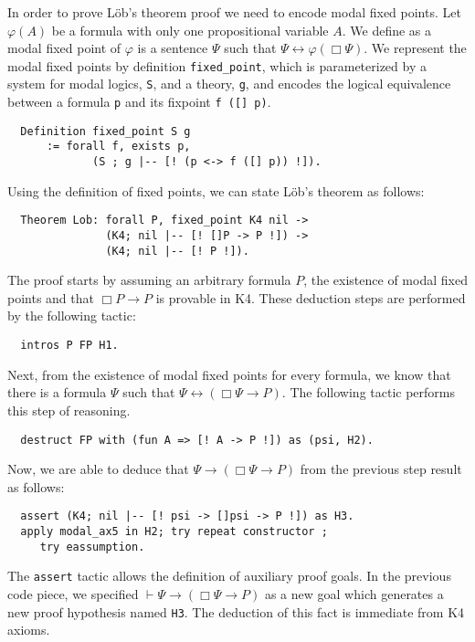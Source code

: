 \documentclass[sigconf]{acmart}
\begin{document}
In order to prove L\"ob's theorem proof we need to encode modal
fixed points. Let $\varphi(A)$ be a formula with only one propositional variable
$A$. We define as a modal fixed point of $\varphi$ is a sentence $\Psi$ such that
$\Psi \leftrightarrow \varphi(\Box \Psi)$.
We represent the modal fixed points by definition \texttt{fixed_point},
which is parameterized by a system for modal logics, \texttt{S}, and a
theory, \texttt{g}, and encodes the logical equivalence between a
formula \texttt{p} and its fixpoint \texttt{f ([] p)}. 
\begin{verbatim}
  Definition fixed_point S g
      := forall f, exists p,
             (S ; g |-- [! (p <-> f ([] p)) !]).
\end{verbatim}

\noindent Using the definition of fixed points, we can state L\"ob's theorem as follows:

\begin{verbatim}
  Theorem Lob: forall P, fixed_point K4 nil ->
               (K4; nil |-- [! []P -> P !]) ->
               (K4; nil |-- [! P !]).
\end{verbatim}

\noindent The proof starts by assuming an arbitrary formula $P$, the existence of modal fixed
points and that $\Box P \to P$ is provable in K4. These deduction steps
are performed by the following tactic:

\begin{verbatim}
  intros P FP H1.
\end{verbatim}

\noindent Next, from the existence of modal fixed points for every formula,
we know that there is a formula $\Psi$ such that $\Psi \leftrightarrow (\Box
\Psi \to P)$. The following tactic performs this step of reasoning.

\begin{verbatim}
  destruct FP with (fun A => [! A -> P !]) as (psi, H2).
\end{verbatim}

\noindent Now, we are able to deduce that $\Psi \to (\Box \Psi\to P)$ from the previous
step result as follows:

\begin{verbatim}
  assert (K4; nil |-- [! psi -> []psi -> P !]) as H3.
  apply modal_ax5 in H2; try repeat constructor ;
     try eassumption.
\end{verbatim}

\noindent The \texttt{assert} tactic allows the definition of
auxiliary proof goals. In the previous code piece, we specified
$\vdash \Psi \to (\Box \Psi \to P)$ as a new goal which
generates a new proof hypothesis named \texttt{H3}. The
deduction of this fact is immediate from K4 axioms.
\end{document}
